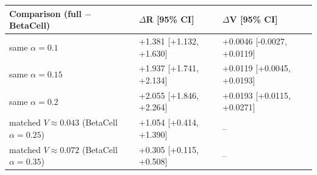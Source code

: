 \begin{tabular}{lll}
\toprule
Comparison (full $-$ BetaCell) & $\Delta$R [95\% CI] & $\Delta$V [95\% CI] \\
\midrule
same $\alpha=0.1$ & +1.381 [+1.132, +1.630] & +0.0046 [-0.0027, +0.0119] \\
same $\alpha=0.15$ & +1.937 [+1.741, +2.134] & +0.0119 [+0.0045, +0.0193] \\
same $\alpha=0.2$ & +2.055 [+1.846, +2.264] & +0.0193 [+0.0115, +0.0271] \\
\midrule
matched $V\approx0.043$ (BetaCell $\alpha=0.25$) & +1.054 [+0.414, +1.390] & -- \\
matched $V\approx0.072$ (BetaCell $\alpha=0.35$) & +0.305 [+0.115, +0.508] & -- \\
\bottomrule
\end{tabular}
